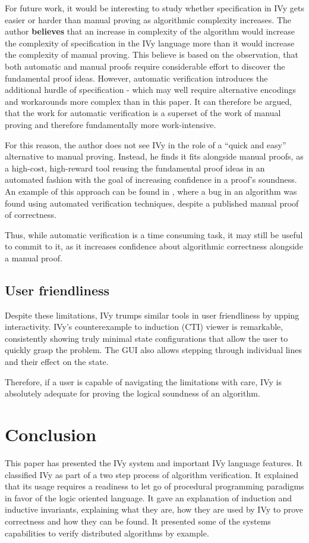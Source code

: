 \documentclass[fleqn]{article}
\begin{document}
For future work, it would be interesting to study whether specification in IVy gets easier or harder than manual proving as algorithmic complexity increases. The author \textbf{believes} that an increase in complexity of the algorithm would increase the complexity of specification in the IVy language more than it would increase the complexity of manual proving. This believe is based on the observation, that both automatic and manual proofs require considerable effort to discover the fundamental proof ideas. However, automatic verification introduces the additional hurdle of specification - which may well require alternative encodings and workarounds more complex than in this paper. It can therefore be argued, that the work for automatic verification is a superset of the work of manual proving and therefore fundamentally more work-intensive.

For this reason, the author does not see IVy in the role of a ``quick and easy'' alternative to manual proving. Instead, he finds it fits alongside manual proofs, as a high-cost, high-reward tool reusing the fundamental proof ideas in an automated fashion with the goal of increasing confidence in a proof's soundness. An example of this approach can be found in \cite{wrongProof}, where a bug in an algorithm was found using automated verification techniques, despite a published manual proof of correctness.

Thus, while automatic verification is a time consuming task, it may still be useful to commit to it, as it increases confidence about algorithmic correctness alongside a manual proof.

\subsection{User friendliness}
Despite these limitations, IVy trumps similar tools in user friendliness by upping interactivity. \cite{ivy}
IVy's counterexample to induction (CTI) viewer is remarkable, consistently showing truly minimal
state configurations that allow the user to quickly grasp the problem. The GUI also allows stepping
through individual lines and their effect on the state.


Therefore, if a user is capable of navigating the limitations with care, IVy is absolutely adequate for proving the logical soundness of an algorithm.



\section{Conclusion}
This paper has presented the IVy system and important IVy language features. It classified IVy
as part of a two step process of algorithm verification.
It explained that its usage requires a readiness to let go of procedural programming paradigms
in favor of the logic oriented language. It gave an explanation of induction and inductive invariants,
explaining what they are, how they are used by IVy to prove correctness and how they can be found.
It presented some of the systems capabilities to verify distributed algorithms by example.
\end{document}
